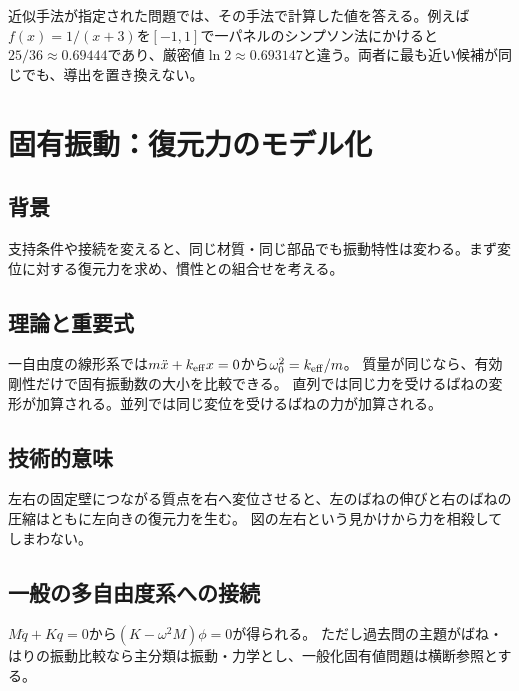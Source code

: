 近似手法が指定された問題では、その手法で計算した値を答える。例えば$f(x)=1/(x+3)$を$[-1,1]$で一パネルのシンプソン法にかけると$25/36\approx0.69444$であり、厳密値$\ln2\approx0.693147$と違う。両者に最も近い候補が同じでも、導出を置き換えない。

\section{固有振動：復元力のモデル化}
\subsection{背景}
支持条件や接続を変えると、同じ材質・同じ部品でも振動特性は変わる。まず変位に対する復元力を求め、慣性との組合せを考える。
\subsection{理論と重要式}
一自由度の線形系では$m\ddot{x}+k_{\rm eff}x=0$から$\omega_0^2=k_{\rm eff}/m$。
質量が同じなら、有効剛性だけで固有振動数の大小を比較できる。
直列では同じ力を受けるばねの変形が加算される。並列では同じ変位を受けるばねの力が加算される。
\subsection{技術的意味}
左右の固定壁につながる質点を右へ変位させると、左のばねの伸びと右のばねの圧縮はともに左向きの復元力を生む。
図の左右という見かけから力を相殺してしまわない。
\subsection{一般の多自由度系への接続}
$M\ddot{q}+Kq=0$から$(K-\omega^2M)\phi=0$が得られる。
ただし過去問の主題がばね・はりの振動比較なら主分類は振動・力学とし、一般化固有値問題は横断参照とする。






